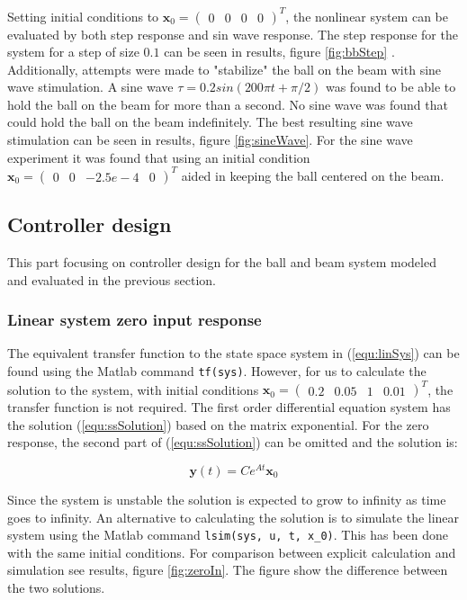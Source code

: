 \documentclass[a4paper, titlepage]{article}
\begin{document}
Setting initial conditions to $\textbf{x}_0 = \begin{pmatrix} 0 & 0 & 0 & 0 \end{pmatrix}^T$, the nonlinear system can be evaluated by both step response and sin wave response.
The step response for the system for a step of size $0.1$ can be seen in results, figure \ref{fig:bbStep}	.
Additionally, attempts were made to "stabilize" the ball on the beam with sine wave stimulation.
A sine wave $\tau = 0.2sin(200\pi t + \pi/2)$ was found to be able to hold the ball on the beam for more than a second.
No sine wave was found that could hold the ball on the beam indefinitely. 
The best resulting sine wave stimulation can be seen in results, figure \ref{fig:sineWave}.
For the sine wave experiment it was found that using an initial condition $\textbf{x}_0 = \begin{pmatrix} 0 & 0 & -2.5e-4 & 0 \end{pmatrix}^T$ aided in keeping the ball centered on the beam.

\subsection{Controller design}
This part focusing on controller design for the ball and beam system modeled and evaluated in the previous section.

\subsubsection{Linear system zero input response}
The equivalent transfer function to the state space system in (\ref{equ:linSys}) can be found using the Matlab command \verb|tf(sys)|.
However, for us to calculate the solution to the system, with initial conditions $\textbf{x}_0 = \begin{pmatrix} 0.2 & 0.05 & 1 & 0.01	 \end{pmatrix}^T$, the transfer function is not required.
The first order differential equation system has the solution (\ref{equ:ssSolution}) based on the matrix exponential.
For the zero response, the second part of (\ref{equ:ssSolution}) can be omitted and the solution is:

\begin{equation}
\textbf{y}(t) = Ce^{At}\textbf{x}_0
\end{equation}

Since the system is unstable the solution is expected to grow to infinity as time goes to infinity.
An alternative to calculating the solution is to simulate the linear system using the Matlab command \verb|lsim(sys, u, t, x_0)|.
This has been done with the same initial conditions.
For comparison between explicit calculation and simulation see results, figure \ref{fig:zeroIn}.
The figure show the difference between the two solutions.
\end{document}

